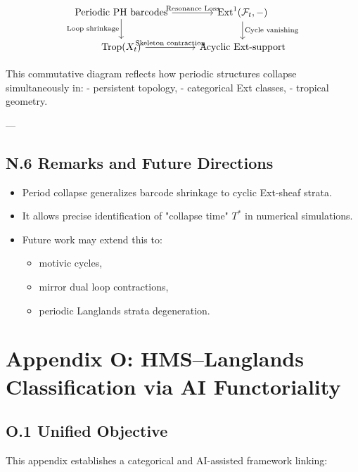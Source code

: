 \documentclass[11pt]{article}
\begin{document}
\[
\begin{tikzcd}
\text{Periodic PH barcodes} \arrow[r, "\text{Resonance Loss}"] \arrow[d, "\text{Loop shrinkage}"'] &
\mathrm{Ext}^1(\mathcal{F}_t, -) \arrow[d, "\text{Cycle vanishing}"] \\
\mathrm{Trop}(X_t) \arrow[r, "\text{Skeleton contraction}"] &
\text{Acyclic Ext-support}
\end{tikzcd}
\]

This commutative diagram reflects how periodic structures collapse simultaneously in:
- persistent topology,
- categorical Ext classes,
- tropical geometry.

---

\subsection*{N.6 Remarks and Future Directions}

\begin{itemize}
  \item Period collapse generalizes barcode shrinkage to cyclic Ext-sheaf strata.
  \item It allows precise identification of "collapse time" $T^*$ in numerical simulations.
  \item Future work may extend this to:
    \begin{itemize}
      \item motivic cycles,
      \item mirror dual loop contractions,
      \item periodic Langlands strata degeneration.
    \end{itemize}
\end{itemize}


\section*{Appendix O: HMS–Langlands Classification via AI Functoriality}

\subsection*{O.1 Unified Objective}

This appendix establishes a categorical and AI-assisted framework linking:
\end{document}
